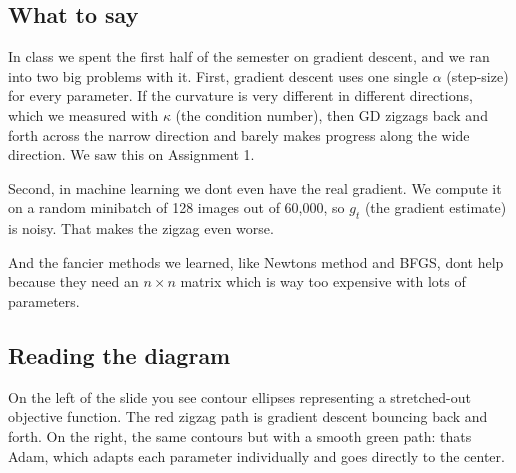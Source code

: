 \documentclass[11pt, letterpaper]{article}
\begin{document}
\subsection{What to say}

In class we spent the first half of the semester on gradient descent, and we ran into two big problems with it. First, gradient descent uses one single $\alpha$ (step-size) for every parameter. If the curvature is very different in different directions, which we measured with $\kappa$ (the condition number), then GD zigzags back and forth across the narrow direction and barely makes progress along the wide direction. We saw this on Assignment 1.

Second, in machine learning we dont even have the real gradient. We compute it on a random minibatch of 128 images out of 60,000, so $g_t$ (the gradient estimate) is noisy. That makes the zigzag even worse.

And the fancier methods we learned, like Newtons method and BFGS, dont help because they need an $n \times n$ matrix which is way too expensive with lots of parameters.

\subsection{Reading the diagram}
On the left of the slide you see contour ellipses representing a stretched-out objective function. The red zigzag path is gradient descent bouncing back and forth. On the right, the same contours but with a smooth green path: thats Adam, which adapts each parameter individually and goes directly to the center.
\end{document}
